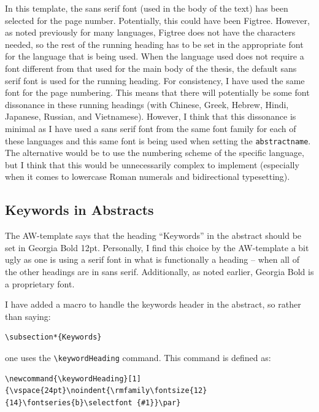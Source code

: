 \documentclass[12pt, twoside]{article}
\begin{document}
In this template, the sans serif font (used in the body of the text) has been selected for the page number. Potentially, this could have been Figtree. However, as noted previously for many languages, Figtree does not have the characters needed, so the rest of the running heading has to be set in the appropriate font for the language that is being used. When the language used does not require a font different from that used for the main body of the thesis, the default sans serif font is used for the running heading. For consistency, I have used the same font for the page numbering. This means that there will potentially be some font dissonance in these running headings (\eg with Chinese, Greek, Hebrew, Hindi, Japanese, Russian, and Vietnamese). However, I think that this dissonance is minimal as \first I have used a sans serif font from the same font family for each of these languages and \Second this same font is being used when setting the \texttt{abstractname}. The alternative would be to use the numbering scheme of the specific language, but I think that this would be unnecessarily complex to implement (especially when it comes to lowercase Roman numerals and bidirectional typesetting).

\subsection{Keywords in Abstracts}
\label{sec:cycle3KeywordsInAbstracts}
The AW-template says that the heading ``Keywords'' in the abstract should be set in Georgia Bold 12pt. Personally, I find this choice by the AW-template a bit ugly as one is using a serif font in what is functionally a heading -- when all of the other headings are in sans serif. Additionally, as noted earlier, Georgia Bold is a proprietary font.

I have added a macro to handle the keywords header in the abstract, so rather than saying:
\begin{lstlisting}[style=latexExampleForAuthors]
\subsection*{Keywords}
\end{lstlisting}
one uses the \texttt{\textbackslash keywordHeading} command. This command is defined as:
\begin{lstlisting}[style=latexExampleForAuthors]
\newcommand{\keywordHeading}[1]{\vspace{24pt}\noindent{\rmfamily\fontsize{12}{14}\fontseries{b}\selectfont {#1}}\par}
\end{lstlisting}
\end{document}

